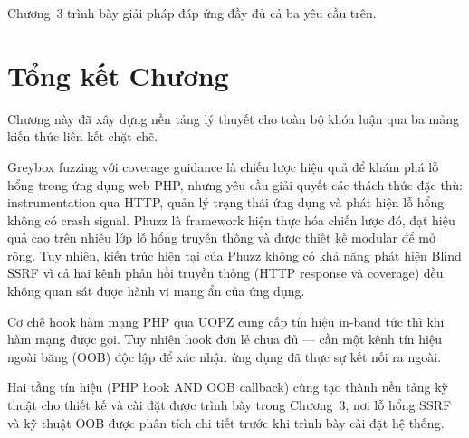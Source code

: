 Chương~3 trình bày giải pháp đáp ứng đầy đủ cả ba yêu cầu trên.

\section{Tổng kết Chương}

Chương này đã xây dựng nền tảng lý thuyết cho toàn bộ khóa luận qua ba
mảng kiến thức liên kết chặt chẽ.

Greybox fuzzing với coverage guidance là chiến lược hiệu quả để khám phá
lỗ hổng trong ứng dụng web PHP, nhưng yêu cầu giải quyết các thách thức
đặc thù: instrumentation qua HTTP, quản lý trạng thái ứng dụng và phát hiện
lỗ hổng không có crash signal. Phuzz là framework hiện thực hóa chiến lược
đó, đạt hiệu quả cao trên nhiều lớp lỗ hổng truyền thống và được thiết kế
modular để mở rộng. Tuy nhiên, kiến trúc hiện tại của Phuzz không có khả
năng phát hiện Blind SSRF vì cả hai kênh phản hồi truyền thống (HTTP response
và coverage) đều không quan sát được hành vi mạng ẩn của ứng dụng.

Cơ chế hook hàm mạng PHP qua UOPZ cung cấp tín hiệu in-band tức thì khi
hàm mạng được gọi. Tuy nhiên hook đơn lẻ chưa đủ --- cần một kênh tín hiệu
ngoài băng (OOB) độc lập để xác nhận ứng dụng đã thực sự kết nối ra ngoài.

Hai tầng tín hiệu (PHP hook AND OOB callback) cùng tạo thành nền tảng kỹ
thuật cho thiết kế và cài đặt được trình bày trong Chương~3, nơi lỗ hổng
SSRF và kỹ thuật OOB được phân tích chi tiết trước khi trình bày cài đặt
hệ thống.

